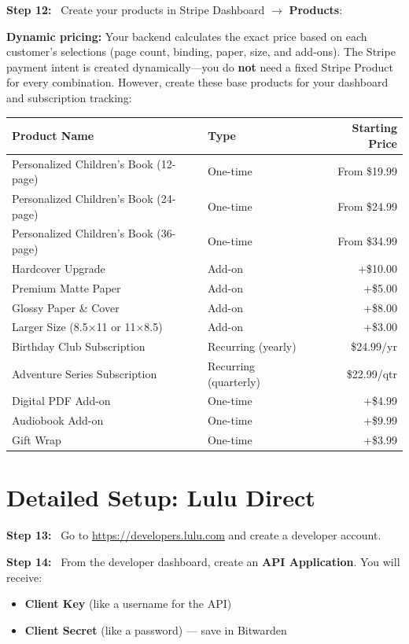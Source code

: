 \documentclass[12pt, letterpaper, oneside]{book}
\newcommand{\step}[1]{\noindent\textbf{\textcolor{primary}{Step #1:}}~}
\begin{document}
\step{12} Create your products in Stripe Dashboard $\rightarrow$ \textbf{Products}:

\begin{infobox}
\textbf{Dynamic pricing:} Your backend calculates the exact price based on each customer's selections (page count, binding, paper, size, and add-ons). The Stripe payment intent is created dynamically---you do \textbf{not} need a fixed Stripe Product for every combination. However, create these base products for your dashboard and subscription tracking:
\end{infobox}

\begin{table}[H]
\centering
\begin{tabularx}{\textwidth}{Xlr}
\toprule
\textbf{Product Name} & \textbf{Type} & \textbf{Starting Price} \\
\midrule
Personalized Children's Book (12-page) & One-time & From \$19.99 \\
Personalized Children's Book (24-page) & One-time & From \$24.99 \\
Personalized Children's Book (36-page) & One-time & From \$34.99 \\
Hardcover Upgrade & Add-on & +\$10.00 \\
Premium Matte Paper & Add-on & +\$5.00 \\
Glossy Paper \& Cover & Add-on & +\$8.00 \\
Larger Size (8.5$\times$11 or 11$\times$8.5) & Add-on & +\$3.00 \\
Birthday Club Subscription & Recurring (yearly) & \$24.99/yr \\
Adventure Series Subscription & Recurring (quarterly) & \$22.99/qtr \\
Digital PDF Add-on & One-time & +\$4.99 \\
Audiobook Add-on & One-time & +\$9.99 \\
Gift Wrap & One-time & +\$3.99 \\
\bottomrule
\end{tabularx}
\end{table}

\section{Detailed Setup: Lulu Direct}

\step{13} Go to \url{https://developers.lulu.com} and create a developer account.

\step{14} From the developer dashboard, create an \textbf{API Application}. You will receive:
\begin{itemize}[leftmargin=2em]
  \item \textbf{Client Key} (like a username for the API)
  \item \textbf{Client Secret} (like a password) --- save in Bitwarden
\end{itemize}
\end{document}
